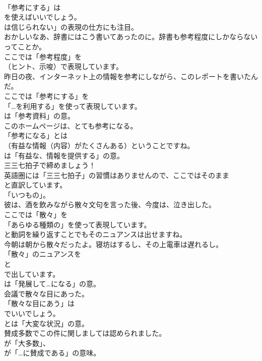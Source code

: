 \documentclass[8pt]{extreport}
\begin{document}
\begin{CJK}{UTF8}{min}
\\	「参考にする」は
\\	を使えばいいでしょう。
\\	は信じられない」の表現の仕方にも注目。	
\\	おかしいなあ、辞書にはこう書いてあったのに。辞書も参考程度にしかならないってことか。 
\\	ここでは「参考程度」を
\\	（ヒント、示唆）で表現しています。	
\\	昨日の夜、インターネット上の情報を参考にしながら、このレポートを書いたんだ。 
\\	ここでは「参考にする」を
\\	「…を利用する」を使って表現しています。
\\	は「参考資料」の意。	
\\	このホームページは、とても参考になる。 
\\	「参考になる」とは 
\\	（有益な情報（内容）がたくさんある）ということですね。
\\	は「有益な、情報を提供する」の意。	
\\	三三七拍子で締めましょう！ 
\\	英語圏には「三三七拍子」の習慣はありませんので、ここではそのまま
\\	と直訳しています。
\\	「いつもの」。	
\\	彼は、酒を飲みながら散々文句を言った後、今度は、泣き出した。 
\\	ここでは「散々」を
\\	「あらゆる種類の」を使って表現しています。
\\	と動詞を繰り返すことでもそのニュアンスは出せますね。	
\\	今朝は朝から散々だったよ。寝坊はするし、その上電車は遅れるし。 
\\	「散々」のニュアンスを
\\	と
\\	で出しています。
\\	は「発展して…になる」の意。	
\\	会議で散々な目にあった。 
\\	「散々な目にあう」は
\\	でいいでしょう。
\\	とは「大変な状況」の意。	
\\	賛成多数でこの件に関しましては認められました。 
\\	が「大多数」、
\\	が「…に賛成である」の意味。

\end{CJK}
\end{document}
